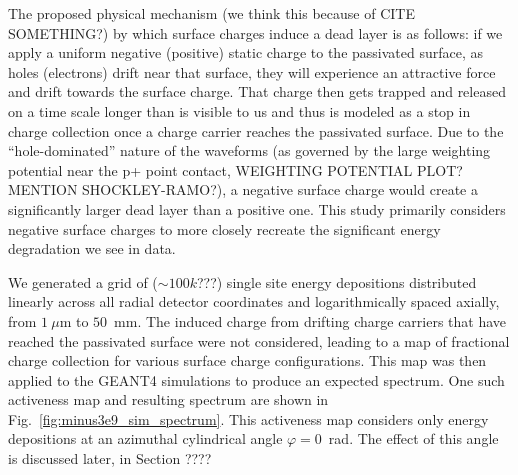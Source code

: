 \documentclass[nofootinbib,superscriptaddress, aps, prc, 
10pt, amsmath, amssymb, bibnotes,
altaffilletter, twocolumn, floatfix]{revtex4-2}
\begin{document}
        The proposed physical mechanism (we think this because of CITE SOMETHING?) by which surface charges induce a dead layer is as follows: if we apply a uniform negative (positive) static charge to the passivated surface, as holes (electrons) drift near that surface, they will experience an attractive force and drift towards the surface charge. That charge then gets trapped and released on a time scale longer than is visible to us and thus is modeled as a stop in charge collection once a charge carrier reaches the passivated surface. Due to the ``hole-dominated'' nature of the waveforms (as governed by the large weighting potential near the p+ point contact, WEIGHTING POTENTIAL PLOT? MENTION SHOCKLEY-RAMO?), a negative surface charge would create a significantly larger dead layer than a positive one. This study primarily considers negative surface charges to more closely recreate the significant energy degradation we see in data.

        We generated a grid of ($\sim100k$???) single site energy depositions distributed linearly across all radial detector coordinates and logarithmically spaced axially, from $1~\mu$m to $50$~mm. The induced charge from drifting charge carriers that have reached the passivated surface were not considered, leading to a map of fractional charge collection for various surface charge configurations. This map was then applied to the GEANT4 simulations to produce an expected spectrum. One such activeness map and resulting spectrum are shown in Fig.~\ref{fig:minus3e9_sim_spectrum}. This activeness map considers only energy depositions at an azimuthal cylindrical angle $\varphi = 0$~rad. The effect of this angle is discussed later, in Section ????




\end{document}
